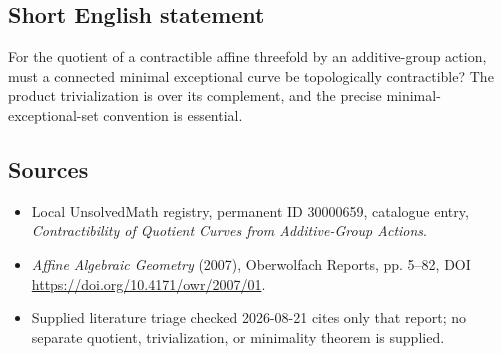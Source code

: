\documentclass[11pt]{article}
\begin{document}
\subsection{Short English statement}
For the quotient of a contractible affine threefold by an additive-group action, must a connected minimal exceptional curve be topologically contractible? The product trivialization is over its complement, and the precise minimal-exceptional-set convention is essential.
\subsection{Sources}
\begin{itemize}
\item Local UnsolvedMath registry, permanent ID 30000659, catalogue entry, \emph{Contractibility of Quotient Curves from Additive-Group Actions}.
\item \emph{Affine Algebraic Geometry} (2007), Oberwolfach Reports, pp. 5--82, DOI \url{https://doi.org/10.4171/owr/2007/01}.
\item Supplied literature triage checked 2026-08-21 cites only that report; no separate quotient, trivialization, or minimality theorem is supplied.
\end{itemize}
\end{document}
